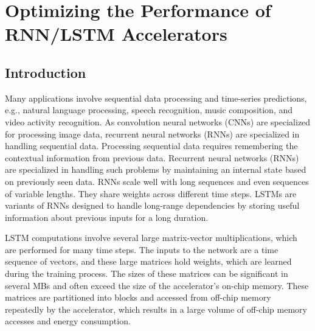 \graphicspath{{./Ch4-RNN/images/}}

\chapter{Optimizing the Performance of RNN/LSTM Accelerators} \label{chap:RNN}
\section{Introduction}
Many applications involve sequential data processing and time-series predictions, e.g., natural language processing, speech recognition, music composition, and video activity recognition. As convolution neural networks (CNNs) are specialized for processing image data, recurrent neural networks (RNNs) are specialized in handling sequential data. Processing sequential data requires remembering the contextual information from previous data. Recurrent neural networks (RNNs) are specialized in handling such problems by maintaining an internal state based on previously seen data. RNNs scale well with long sequences and even sequences of variable lengths. They share weights across different time steps. LSTMs \cite{hochreiter1997long} are variants of RNNs designed to handle long-range dependencies by storing useful information about previous inputs for a long duration. 

LSTM computations involve several large matrix-vector multiplications, which are performed for many time steps. The inputs to the network are a time sequence of vectors, and these large matrices hold weights, which are learned during the training process. The sizes of these matrices can be significant in several MBs and often exceed the size of the accelerator's on-chip memory. These matrices are partitioned into blocks and accessed from off-chip memory repeatedly by the accelerator, which results in a large volume of off-chip memory accesses and energy consumption.
